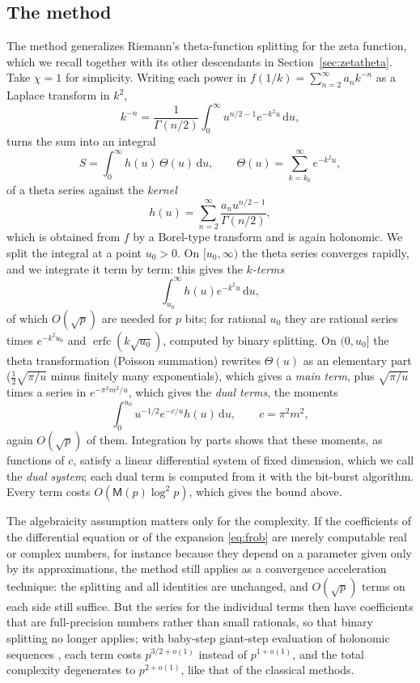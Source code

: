 \documentclass[11pt]{amsart}
\theoremstyle{definition}
\theoremstyle{remark}
\newcommand{\erfc}{\operatorname{erfc}}
\newcommand{\dd}{\,\mathrm{d}}
\newcommand{\Mul}{\mathsf{M}}
\begin{document}
\subsection{The method}\label{sec:method}
The method generalizes Riemann's theta-function splitting for the zeta function, which we recall together with its
other descendants in Section~\ref{sec:zetatheta}. Take $\chi = 1$ for simplicity. Writing each power in
$f(1/k) = \sum_{n=2}^{\infty} a_nk^{-n}$ as a Laplace transform in $k^2$,
\[
  k^{-n} = \frac{1}{\Gamma(n/2)}\int_0^\infty u^{n/2-1}e^{-k^2u}\dd u,
\]
turns the sum into an integral
\[
  S = \int_0^\infty h(u)\,\Theta(u)\dd u, \qquad \Theta(u) = \sum_{k=k_0}^{\infty}e^{-k^2u},
\]
of a theta series against the \emph{kernel}
\[
  h(u) = \sum_{n=2}^{\infty} \frac{a_n u^{n/2-1}}{\Gamma(n/2)},
\]
which is obtained from $f$ by a Borel-type transform and is again holonomic. We split the integral at a point
$u_0 > 0$. On $[u_0, \infty)$ the theta series converges rapidly, and we integrate it term by term: this gives the
\emph{$k$-terms}
\[
  \int_{u_0}^\infty h(u)e^{-k^2u}\dd u,
\]
of which $O(\sqrt p)$ are needed for $p$ bits; for rational $u_0$ they are rational series times $e^{-k^2u_0}$ and
$\erfc(k\sqrt{u_0})$, computed by binary splitting. On $(0, u_0]$ the theta transformation (Poisson summation)
rewrites $\Theta(u)$ as an elementary part ($\frac12\sqrt{\pi/u}$ minus finitely many exponentials), which gives a
\emph{main term}, plus $\sqrt{\pi/u}$ times a series in $e^{-\pi^2m^2/u}$, which gives the \emph{dual terms}, the
moments
\[
  \int_0^{u_0}u^{-1/2}e^{-c/u}h(u)\dd u, \qquad c = \pi^2m^2,
\]
again $O(\sqrt p)$ of them. Integration by parts shows that these moments, as functions of $c$,
satisfy a linear differential system of fixed dimension, which we call the \emph{dual system}; each dual term is
computed from it with the bit-burst algorithm. Every term costs $O(\Mul(p)\log^2 p)$, which gives the bound above.

The algebraicity assumption matters only for the complexity. If the coefficients of the differential equation or of the expansion \eqref{eq:frob} are merely computable real or
complex numbers, for instance because they depend on a parameter given only by its approximations, the method still
applies as a convergence acceleration technique: the splitting and all identities are unchanged, and $O(\sqrt p)$
terms on each side still suffice. But the series for the individual terms then have coefficients that are
full-precision numbers rather than small rationals, so that binary splitting no longer applies; with baby-step
giant-step evaluation of holonomic sequences \cite{BGS07,Joh14}, each term costs $p^{3/2+o(1)}$ instead of
$p^{1+o(1)}$, and the total complexity degenerates to $p^{2+o(1)}$, like that of the classical methods.
\end{document}
